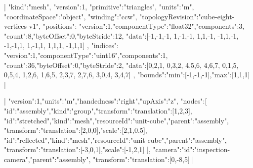 \documentclass{article}
\begin{document}


|{
  "kind":"mesh", "version":1, "primitive":"triangles",
  "units":"m", "coordinateSpace":"object", "winding":"ccw",
  "topologyRevision":"cube-eight-vertices-v1",
  "positions":{
    "version":1,"componentType":"float32","components":3,
    "count":8,"byteOffset":0,"byteStride":12,
    "data":[-1,-1,-1, 1,-1,-1, 1,1,-1, -1,1,-1,
            -1,-1,1, 1,-1,1, 1,1,1, -1,1,1]
  },
  "indices":{
    "version":1,"componentType":"uint16","components":1,
    "count":36,"byteOffset":0,"byteStride":2,
    "data":[0,2,1, 0,3,2, 4,5,6, 4,6,7,
            0,1,5, 0,5,4, 1,2,6, 1,6,5,
            2,3,7, 2,7,6, 3,0,4, 3,4,7]
  },
  "bounds":{"min":[-1,-1,-1],"max":[1,1,1]}
}|

\loomspace|{
  "version":1,"units":"m","handedness":"right","upAxis":"z",
  "nodes":[
    {"id":"assembly","kind":"group","transform":{"translation":[1,2,3]}},
    {"id":"stretched","kind":"mesh","resourceId":"unit-cube","parent":"assembly",
     "transform":{"translation":[2,0,0],"scale":[2,1,0.5]}},
    {"id":"reflected","kind":"mesh","resourceId":"unit-cube","parent":"assembly",
     "transform":{"translation":[-3,0,1],"scale":[-1,2,1]}}
  ],
  "camera":{"id":"inspection-camera","parent":"assembly",
            "transform":{"translation":[0,-8,5]}}
}|
\end{document}
